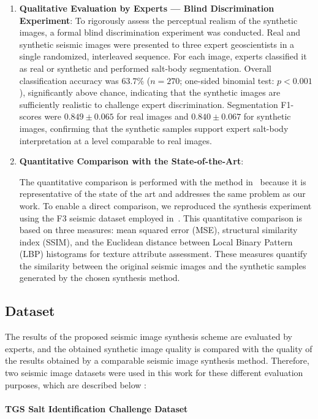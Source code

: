 \documentclass{ieeeaccess}
\begin{document}
\begin{enumerate}
    \item \textbf{Qualitative Evaluation by Experts — Blind Discrimination Experiment}: To rigorously assess the perceptual realism of the synthetic images, a formal blind discrimination experiment was conducted. Real and synthetic seismic images were presented to three expert geoscientists in a single randomized, interleaved sequence. For each image, experts classified it as real or synthetic and performed salt-body segmentation. Overall classification accuracy was $63.7\%$ ($n = 270$; one-sided binomial test: $p < 0.001$), significantly above chance, indicating that the synthetic images are sufficiently realistic to challenge expert discrimination. Segmentation F1-scores were $0.849 \pm 0.065$ for real images and $0.840 \pm 0.067$ for synthetic images, confirming that the synthetic samples support expert salt-body interpretation at a level comparable to real images.
    
    \item \textbf{Quantitative Comparison with the State-of-the-Art}:
    
    The quantitative comparison is performed with the method in~\cite{Ferreira2020} because it is representative of the state of the art and addresses the same problem as our work. To enable a direct comparison, we reproduced the synthesis experiment using the F3 seismic dataset employed in~\cite{Ferreira2020}. This quantitative comparison is based on three measures: mean squared error (MSE), structural similarity index (SSIM), and the Euclidean distance between Local Binary Pattern (LBP) histograms for texture attribute assessment. These measures quantify the similarity between the original seismic images and the synthetic samples generated by the chosen synthesis method.
\end{enumerate}


\subsection{Dataset}

The results of the proposed seismic image synthesis scheme are evaluated by experts, and the obtained synthetic image quality is compared with the quality of the results obtained by a comparable seismic image synthesis method. Therefore, two seismic image datasets were used in this work for these different evaluation purposes, which are described below :

\paragraph{TGS Salt Identification Challenge Dataset}
\end{document}
